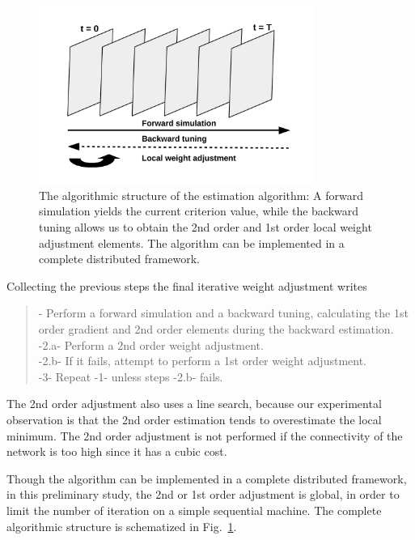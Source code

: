 \begin{figure}[!ht]
  \includegraphics[width=0.8\textwidth]{img/estimation-algo}
  \caption{The algorithmic structure of the estimation algorithm: A forward simulation yields the current criterion value, while the backward tuning allows us to obtain the 2nd order and 1st order local weight adjustment elements. The algorithm can be implemented in a complete distributed framework.}
  \label{estimation-algo}
\end{figure}

Collecting the previous steps the final iterative weight adjustment writes\begin{quotation}{\small 
{}- Perform a forward simulation and a backward tuning, calculating the 1st order gradient and 2nd order elements during the backward estimation.
\\\hspace{0.5cm} -2.a- Perform a 2nd order weight adjustment.
\\\hspace{0.5cm} -2.b- If it fails, attempt to perform a 1st order weight adjustment.
\\-3- Repeat -1- unless steps -2.b- fails.
}\end{quotation}

The 2nd order adjustment also uses a line search, because our experimental observation is that the 2nd order estimation tends to overestimate the local minimum. The 2nd order adjustment is not performed if the connectivity of the network is too high since it has a cubic cost.

Though the algorithm can be implemented in a complete distributed framework, in this preliminary study, the 2nd or 1st order adjustment is global, in order to limit the number of iteration on a simple sequential machine. The complete algorithmic structure is schematized in Fig.~\ref{estimation-algo}.


\clearpage
